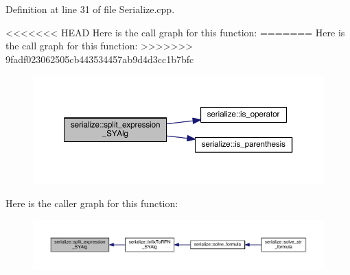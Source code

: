 Definition at line 31 of file Serialize.\+cpp.



<<<<<<< HEAD
Here is the call graph for this function\+:\nopagebreak
=======
Here is the call graph for this function\+:
\nopagebreak
>>>>>>> 9fadf023062505cb443534457ab9d4d3cc1b7bfc
\begin{figure}[H]
\begin{center}
\leavevmode
\includegraphics[width=350pt]{namespaceserialize_a06d144912d025816fe84c532295d274a_cgraph}
\end{center}
\end{figure}




Here is the caller graph for this function\+:
\nopagebreak
\begin{figure}[H]
\begin{center}
\leavevmode
\includegraphics[width=350pt]{namespaceserialize_a06d144912d025816fe84c532295d274a_icgraph}
\end{center}
\end{figure}


